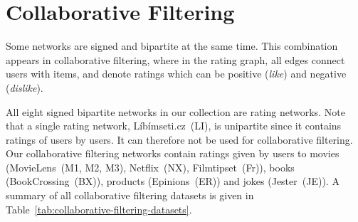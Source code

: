 \documentclass[11pt,a4paper]{book}
\begin{document}
\section{Collaborative Filtering}
\label{sec:signed-bipartite-network}
Some networks are signed and bipartite at the same time.  This
combination appears in collaborative filtering, where in 
the rating graph, all edges connect users with items, and denote ratings
which can be positive (\emph{like}) and negative
(\emph{dislike}).   

All eight signed bipartite networks in our collection are rating
networks. Note that a single rating network, Líbímseti.cz~(\textsf{LI}),
is unipartite since it contains ratings of users by users. It can
therefore not be used for collaborative filtering. 
Our collaborative filtering networks contain ratings given by users to movies
(MovieLens~(\textsf{M1}, \textsf{M2}, \textsf{M3}),
Netflix~(\textsf{NX}), Filmtipset~(\textsf{Fr})), books
(BookCrossing~(\textsf{BX})), products (Epinions~(\textsf{ER})) and
jokes (Jester~(\textsf{JE})). 
A summary of all collaborative filtering datasets is given in
Table~\ref{tab:collaborative-filtering-datasets}. 
\end{document}
